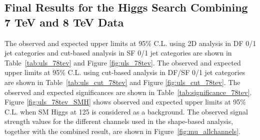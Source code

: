 \clearpage 
\subsection{Final Results for the Higgs Search Combining 7 TeV and 8 TeV Data}
\label{sec:search_results_finalcomb}

The observed and expected upper limits at 95\% C.L. using 2D analysis in DF 0/1 jet categories 
and cut-based analysis in SF 0/1 jet categories are shown in Table~\ref{tab:uls_78tev} and Figure \ref{fig:uls_78tev}.
The observed and expected upper limits at 95\% C.L. using cut-based analysis in DF/SF 0/1 jet categories 
are shown in Table~\ref{tab:uls_cut_78tev} and Figure \ref{fig:uls_cut_78tev}.
The observed and expected significances are shown in Table~\ref{tab:significance_78tev}. 
Figure \ref{fig:uls_78tev_SMH} shows observed and expected upper limits at 95\% C.L.
when SM Higgs at 125 \GeV is considered as a background. The observed signal
strength values for the different channels used in the shape-based analysis,
together with the combined result, are shown in Figure~\ref{fig:mu_allchannels}. 


